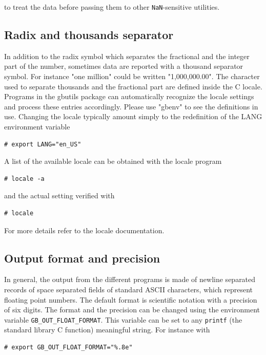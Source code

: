\documentclass[11pt]{article}
\begin{document}
to treat the data before passing them to other \verb~NaN~-sensitive
utilities.

\subsection{Radix and thousands separator}
\label{sec-2-3}

In addition to the radix symbol which separates the fractional and the
integer part of the number, sometimes data are reported with a
thousand separator symbol.  For instance "one million" could be
written "1,000,000.00". The character used to separate thousands and
the fractional part are defined inside the C locale. Programs in the
gbutils package can automatically recognize the locale settings and
process these entries accordingly. Please use "gbenv" to see the
definitions in use. Changing the locale typically amount simply to the
redefinition of the LANG environment variable

\begin{verbatim}
# export LANG="en_US"
\end{verbatim}

A list of the available locale can be obtained with the locale program

\begin{verbatim}
# locale -a
\end{verbatim}

and the actual setting verified with

\begin{verbatim}
# locale
\end{verbatim}

For more details refer to the locale documentation.

\subsection{Output format and precision}
\label{sec-2-4}

In general, the output from the different programs is made of newline
separated records of space separated fields of standard ASCII
characters, which represent floating point numbers. The default format
is scientific notation with a precision of six digits. The format and
the precision can be changed using the environment variable
\texttt{GB\_OUT\_FLOAT\_FORMAT}. This variable can be set to any \texttt{printf} (the
standard library C function) meaningful string. For instance with

\begin{verbatim}
# export GB_OUT_FLOAT_FORMAT="%.8e"
\end{verbatim}
\end{document}

